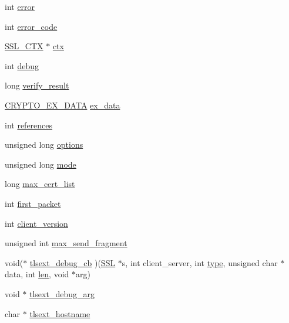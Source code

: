 \begin{DoxyCompactItemize}
\item 
int \hyperlink{structssl__st_aca7ac14e5548bdd96990fa1d12aaef02}{error}
\item 
int \hyperlink{structssl__st_a6a6c337340e6b5986ca6a1381838c9ae}{error\+\_\+code}
\item 
\hyperlink{ossl__typ_8h_a1a21892c1193ee6eb572c2c72d3924ca}{S\+S\+L\+\_\+\+C\+TX} $\ast$ \hyperlink{structssl__st_a5a3ac76eff749d5d3c9ecf6b1a230497}{ctx}
\item 
int \hyperlink{structssl__st_a44db2b5a38c43821c3a852669e48d67f}{debug}
\item 
long \hyperlink{structssl__st_a3092706c43455cf6a410853d90aadb1f}{verify\+\_\+result}
\item 
\hyperlink{ossl__typ_8h_a7eaff1c18057495d8af18f22d1370b51}{C\+R\+Y\+P\+T\+O\+\_\+\+E\+X\+\_\+\+D\+A\+TA} \hyperlink{structssl__st_ab71808924564517a2cfa30d1d5da910e}{ex\+\_\+data}
\item 
int \hyperlink{structssl__st_ac62377797495ce179f0110cb70867ccc}{references}
\item 
unsigned long \hyperlink{structssl__st_a82c8bfd123603c23ccca6fb45be6d75f}{options}
\item 
unsigned long \hyperlink{structssl__st_a10add2996a9ac029c3a8a4c19587e1b0}{mode}
\item 
long \hyperlink{structssl__st_add94a8a6fe24dad252c559253d0eea9a}{max\+\_\+cert\+\_\+list}
\item 
int \hyperlink{structssl__st_ad3c31c44e1c20703dc023f4a14fa0d54}{first\+\_\+packet}
\item 
int \hyperlink{structssl__st_af898db9604614a95a6830fbb5ce31850}{client\+\_\+version}
\item 
unsigned int \hyperlink{structssl__st_a201ff2c24c4a950fc529451563dac099}{max\+\_\+send\+\_\+fragment}
\item 
void($\ast$ \hyperlink{structssl__st_af36d613ef84698654b438baf81872ee6}{tlsext\+\_\+debug\+\_\+cb} )(\hyperlink{ossl__typ_8h_a71f21e09bf365489dab9d85bd4785e24}{S\+SL} $\ast$s, int client\+\_\+server, int \hyperlink{structssl__st_a5d2a229f22c169bd5eecefd9f017e089}{type}, unsigned char $\ast$data, int \hyperlink{x509_8h_ad8c3db4434e9cb5cd772cc009f40e856}{len}, void $\ast$arg)
\item 
void $\ast$ \hyperlink{structssl__st_a37c9fa10121176491c8a9e5617f7be83}{tlsext\+\_\+debug\+\_\+arg}
\item 
char $\ast$ \hyperlink{structssl__st_a693888a588035f237e93b0bce7af4b84}{tlsext\+\_\+hostname}
\item 

\end{DoxyCompactItemize}
